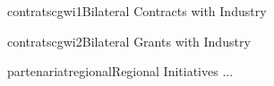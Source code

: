 \documentclass{ra2018}
\begin{document}
\begin{module}{contrats}{cgwi1}{Bilateral Contracts with Industry}
\end{module}

\begin{module}{contrats}{cgwi2}{Bilateral Grants with Industry}
\end{module}



\begin{module}{partenariat}{regional}{Regional Initiatives}
...
\end{module}
\end{document}
